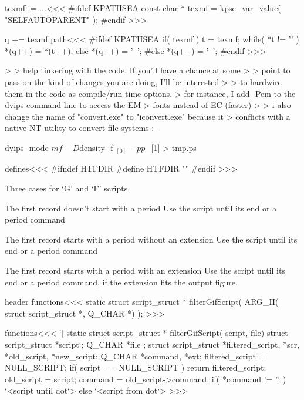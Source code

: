 {\<texmf := ...\><<<
#ifdef KPATHSEA   
const char * texmf = kpse_var_value( "SELFAUTOPARENT" );
#endif
>>>

\<q += texmf path\><<<
#ifdef KPATHSEA   
   if( texmf ){
      t = texmf;
      while( *t != '\0' ){ *(q++) = *(t++); }
   } else {
      *(q++) = '~';
   }
#else
   *(q++) = '~';
#endif
>>>




\Verbatim

>  > help tinkering with the code.  If you'll have a chance at some
>  > point to pass on the kind of changes you are doing, I'll be interested
>  > to hardwire them in the code as compile/run-time options.
> for instance, I add -Pem to the dvips command line to access the EM
> fonts instead of EC (faster)
> 
> i also change the name of "convert.exe" to "iconvert.exe" because it
> conflicts with a native NT utility to convert file systems :-}

\EndVerbatim

\Verbatim
dvips -mode $mf -D $density -f $_[0] -pp $_[1] > tmp.ps
\EndVerbatim

\<defines\><<<      
#ifndef HTFDIR
#define HTFDIR      ""
#endif
>>>









Three cases for `G' and `F' scripts.

\List{}
\item
{The first record doesn't start with a period}
Use the script until its end or a period command
\item
{The first record starts with a period without an extension}
Use the script until its end or a period command
\item
{The first record starts with a period with an extension}
Use the script until its end or a period command, if the extension
fits the output figure.

\EndList


\<header functions\><<<
static struct script_struct  * filterGifScript(
        ARG_II( struct script_struct  *, Q_CHAR *) );
>>>

\<functions\><<<
`[
static struct script_struct * filterGifScript( script, file) 
                                   struct script_struct *script`;
                                                   Q_CHAR *file
;{                                         
                   struct script_struct *filtered_script, *scr,
                                                   *old_script,
                                                   *new_script;
                                         Q_CHAR *command, *ext;
   filtered_script = NULL_SCRIPT;
   if( script == NULL_SCRIPT )
       return filtered_script;
   old_script = script;
   command = old_script->command;
   if( *command != '.' ){
      `<script until dot`> 
   } else {
      `<script from dot`> 
   }   
}
>>>

